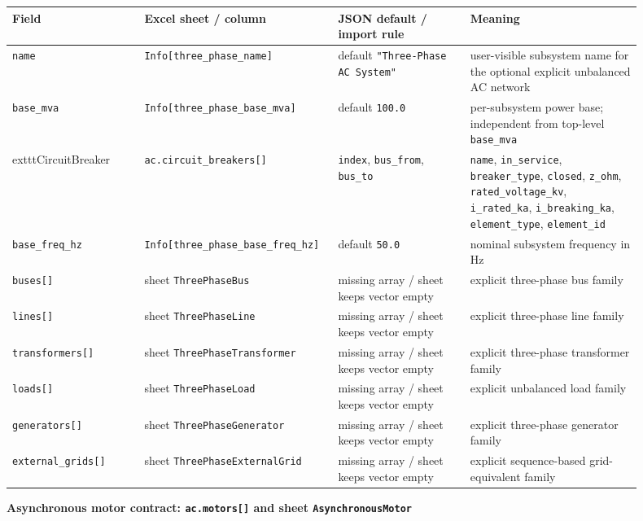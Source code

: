 \begin{longtable}{L{0.20\linewidth}L{0.24\linewidth}L{0.20\linewidth}L{0.26\linewidth}}
\toprule
Field & Excel sheet / column & JSON default / import rule & Meaning \\
\midrule
\endhead
\texttt{name} & \texttt{Info[three\_phase\_name]} & default \texttt{"Three-Phase AC System"} & user-visible subsystem name for the optional explicit unbalanced AC network \\
\texttt{base\_mva} & \texttt{Info[three\_phase\_base\_mva]} & default \texttt{100.0} & per-subsystem power base; independent from top-level \texttt{base\_mva} \\
	exttt{CircuitBreaker} & \texttt{ac.circuit\_breakers[]} & \texttt{index}, \texttt{bus\_from}, \texttt{bus\_to} & \texttt{name}, \texttt{in\_service}, \texttt{breaker\_type}, \texttt{closed}, \texttt{z\_ohm}, \texttt{rated\_voltage\_kv}, \texttt{i\_rated\_ka}, \texttt{i\_breaking\_ka}, \texttt{element\_type}, \texttt{element\_id} \\
\texttt{base\_freq\_hz} & \texttt{Info[three\_phase\_base\_freq\_hz]} & default \texttt{50.0} & nominal subsystem frequency in Hz \\
\texttt{buses[]} & sheet \texttt{ThreePhaseBus} & missing array / sheet keeps vector empty & explicit three-phase bus family \\
\texttt{lines[]} & sheet \texttt{ThreePhaseLine} & missing array / sheet keeps vector empty & explicit three-phase line family \\
\texttt{transformers[]} & sheet \texttt{ThreePhaseTransformer} & missing array / sheet keeps vector empty & explicit three-phase transformer family \\
\texttt{loads[]} & sheet \texttt{ThreePhaseLoad} & missing array / sheet keeps vector empty & explicit unbalanced load family \\
\texttt{generators[]} & sheet \texttt{ThreePhaseGenerator} & missing array / sheet keeps vector empty & explicit three-phase generator family \\
\texttt{external\_grids[]} & sheet \texttt{ThreePhaseExternalGrid} & missing array / sheet keeps vector empty & explicit sequence-based grid-equivalent family \\
\bottomrule
\end{longtable}

\noindent\textbf{Asynchronous motor contract: \texttt{ac.motors[]} and sheet \texttt{AsynchronousMotor}}

